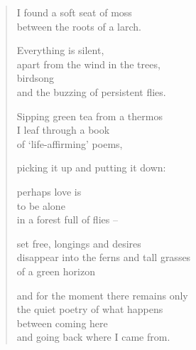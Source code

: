 \begin{verse}
I found a soft seat of moss\\
between the roots of a larch.

Everything is silent,\\
apart from the wind in the trees,\\
birdsong\\
and the buzzing of persistent flies.

Sipping green tea from a thermos\\
I leaf through a book\\
of ‘life-affirming’ poems,

picking it up and putting it down:

perhaps love is\\
to be alone\\
in a forest full of flies --

set free, longings and desires\\
disappear into the ferns and tall grasses\\
of a green horizon

and for the moment there remains only\\
the quiet poetry of what happens\\
between coming here\\
and going back where I came from.
\end{verse}

